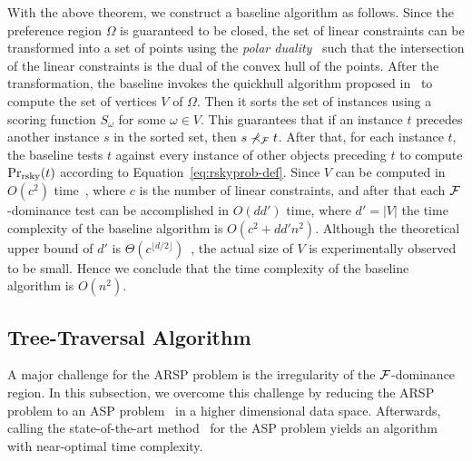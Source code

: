 With the above theorem, we construct a baseline algorithm as follows.
Since the preference region $\Omega$ is guaranteed to be closed, the set of linear constraints can be transformed into a set of points using the \textit{polar duality}~\cite{preparata2012computational} such that the intersection of the linear constraints is the dual of the convex hull of the points.
After the transformation, the baseline invokes the quickhull algorithm proposed in~\cite{DBLP:journals/toms/BarberDH96} to compute the set of vertices $V$ of $\Omega$.
Then it sorts the set of instances using a scoring function $S_\omega$ for some $\omega \in V$.
This guarantees that if an instance $t$ precedes another instance $s$ in the sorted set, then $s \nprec_{\mathcal{F}} t$.
After that, for each instance $t$, the baseline tests $t$ against every instance of other objects preceding $t$ to compute $\Pr_{\rm rsky}(t)$ according to Equation~\ref{eq:rskyprob-def}.
Since $V$ can be computed in $O(c^2)$ time~\cite{greenfield1990proof}, where $c$ is the number of linear constraints, and after that each $\mathcal{F}$-dominance test can be accomplished in $O(dd')$ time, where $d' = |V|$ the time complexity of the baseline algorithm is $O(c^2 + dd'n^2)$.
Although the theoretical upper bound of $d'$ is $\Theta(c^{\lfloor d/2 \rfloor})$~\cite{henk2017basic}, the actual size of $V$ is experimentally observed to be small.
Hence we conclude that the time complexity of the baseline algorithm is $O(n^2)$.	


\subsection{Tree-Traversal Algorithm}\label{subsec:tt}

A major challenge for the ARSP problem is the irregularity of the $\mathcal{F}$-dominance region.
In this subsection, we overcome this challenge by reducing the ARSP problem to an ASP problem~\cite{DBLP:journals/mst/AfshaniAALP13} in a higher dimensional data space.
Afterwards, calling the state-of-the-art method~\cite{DBLP:journals/mst/AfshaniAALP13} for the ASP problem yields an algorithm with near-optimal time complexity.

